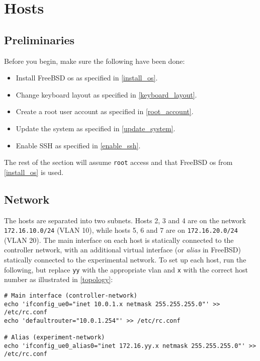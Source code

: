 \chapter{Hosts}


\section{Preliminaries}

Before you begin, make sure the following have been done:

\begin{itemize}
    \item Install FreeBSD \gls{os} as specified in \ref{install_os}.
    \item Change keyboard layout as specified in \ref{keyboard_layout}.
    \item Create a root user account as specified in \ref{root_account}.
    \item Update the system as specified in \ref{update_system}.
    \item Enable SSH as specified in \ref{enable_ssh}.
\end{itemize}

The rest of the section will assume \lstinline{root} access and that FreeBSD \gls{os} from \ref{install_os} is used.


\section{Network}

The hosts are separated into two subnets. Hosts 2, 3 and 4 are on the network \lstinline{172.16.10.0/24} (VLAN 10), while hosts 5, 6 and 7 are on \lstinline{172.16.20.0/24} (VLAN 20). The main interface on each host is statically connected to the controller network, with an additional virtual interface (or \textit{alias} in FreeBSD) statically connected to the experimental network. To set up each host, run the following, but replace \lstinline{yy} with the appropriate \gls{vlan} and \lstinline{x} with the correct host number as illustrated in \ref{topology}:

\begin{lstlisting}
# Main interface (controller-network)
echo 'ifconfig_ue0="inet 10.0.1.x netmask 255.255.255.0"' >> /etc/rc.conf
echo 'defaultrouter="10.0.1.254"' >> /etc/rc.conf

# Alias (experiment-network)
echo 'ifconfig_ue0_alias0="inet 172.16.yy.x netmask 255.255.255.0"' >> /etc/rc.conf
\end{lstlisting}

